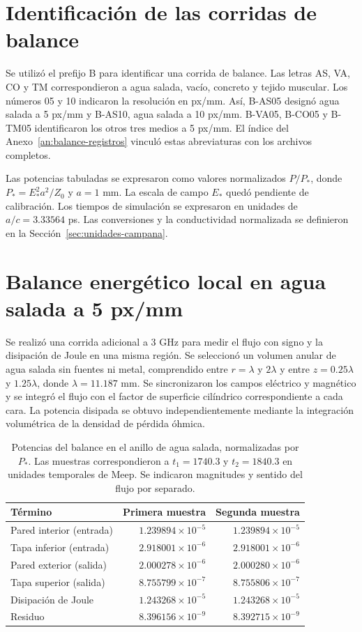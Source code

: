 \section{Identificación de las corridas de balance}
Se utilizó el prefijo B para identificar una corrida de balance. Las letras AS, VA, CO y TM correspondieron a agua salada, vacío, concreto y tejido muscular. Los números 05 y 10 indicaron la resolución en px/mm. Así, B-AS05 designó agua salada a 5 px/mm y B-AS10, agua salada a 10 px/mm. B-VA05, B-CO05 y B-TM05 identificaron los otros tres medios a 5 px/mm. El índice del Anexo~\ref{an:balance-registros} vinculó estas abreviaturas con los archivos completos.

Las potencias tabuladas se expresaron como valores normalizados $P/P_*$, donde $P_*=E_*^2a^2/Z_0$ y $a=1$ mm. La escala de campo $E_*$ quedó pendiente de calibración. Los tiempos de simulación se expresaron en unidades de $a/c=3.33564$ ps. Las conversiones y la conductividad normalizada se definieron en la Sección~\ref{sec:unidades-campana}.

\section{Balance energético local en agua salada a 5 px/mm}\label{sec:balance-agua-cinco}
Se realizó una corrida adicional a 3 GHz para medir el flujo con signo y la disipación de Joule en una misma región. Se seleccionó un volumen anular de agua salada sin fuentes ni metal, comprendido entre $r=\lambda$ y $2\lambda$ y entre $z=0.25\lambda$ y $1.25\lambda$, donde $\lambda=11.187$ mm. Se sincronizaron los campos eléctrico y magnético y se integró el flujo con el factor de superficie cilíndrico correspondiente a cada cara. La potencia disipada se obtuvo independientemente mediante la integración volumétrica de la densidad de pérdida óhmica.

\begin{table}[htbp]\centering\small
\caption{Potencias del balance en el anillo de agua salada, normalizadas por $P_*$. Las muestras correspondieron a $t_1=1740.3$ y $t_2=1840.3$ en unidades temporales de Meep. Se indicaron magnitudes y sentido del flujo por separado.}\label{tab:balance-agua-cinco}
\begin{tabular}{lrr}\hline
Término & Primera muestra & Segunda muestra \\ \hline
Pared interior (entrada) & $1.239894\times10^{-5}$ & $1.239894\times10^{-5}$ \\
Tapa inferior (entrada) & $2.918001\times10^{-6}$ & $2.918001\times10^{-6}$ \\
Pared exterior (salida) & $2.000278\times10^{-6}$ & $2.000280\times10^{-6}$ \\
Tapa superior (salida) & $8.755799\times10^{-7}$ & $8.755806\times10^{-7}$ \\
Disipación de Joule & $1.243268\times10^{-5}$ & $1.243268\times10^{-5}$ \\
Residuo & $8.396156\times10^{-9}$ & $8.392715\times10^{-9}$ \\ \hline
\end{tabular}\end{table}

